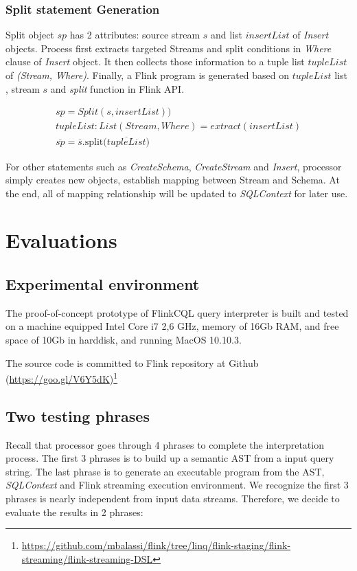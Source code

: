 \subsubsection*{Split statement Generation}

Split object $sp$ has 2 attributes: source stream $s$ and list $insertList$ of \textit{Insert} objects. Process first extracts targeted Streams and split conditions in \textit{Where} clause  of \textit{Insert} object. It then collects those information to a tuple list $tupleList$ of \textit{(Stream, Where)}. Finally, a Flink program is generated based on $tupleList$ list ,  stream $s$ and \textit{split} function in Flink API.

\begin{align}
	sp = Split(s, insertList)) \\
	tupleList: List(Stream, Where) = extract(insertList) \\
	\overline{sp} = \overline{s}\textrm{.split(}\overline{tupleList})
\end{align}

For other statements such as \textit{CreateSchema}, \textit{CreateStream} and \textit{Insert}, processor simply creates new objects, establish mapping between Stream and Schema. At the end, all of mapping relationship will be updated to \textit{SQLContext} for later use.

\section{Evaluations}
\subsection*{Experimental environment}
The proof-of-concept prototype of FlinkCQL query interpreter is built and tested on a machine equipped Intel Core i7 2,6 GHz, memory of 16Gb RAM, and free space of 10Gb in harddisk, and running MacOS 10.10.3.

The source code is committed to Flink repository at Github~ (\href{https://goo.gl/V6Y5dK}{https://goo.gl/V6Y5dK})\footnote{\href{https://github.com/mbalassi/flink/tree/linq/flink-staging/flink-streaming/flink-streaming-DSL}{https://github.com/mbalassi/flink/tree/linq/flink-staging/flink-streaming/flink-streaming-DSL}}


\subsection{Two testing phrases}
Recall that processor goes through 4 phrases to complete the interpretation process. The first 3 phrases is to build up a semantic AST from a input query string. The last phrase is to generate an executable program from the AST,  \textit{SQLContext} and Flink streaming execution environment. We recognize the first 3 phrases is nearly independent from input data streams.  Therefore, we decide to evaluate the results in 2 phrases:

